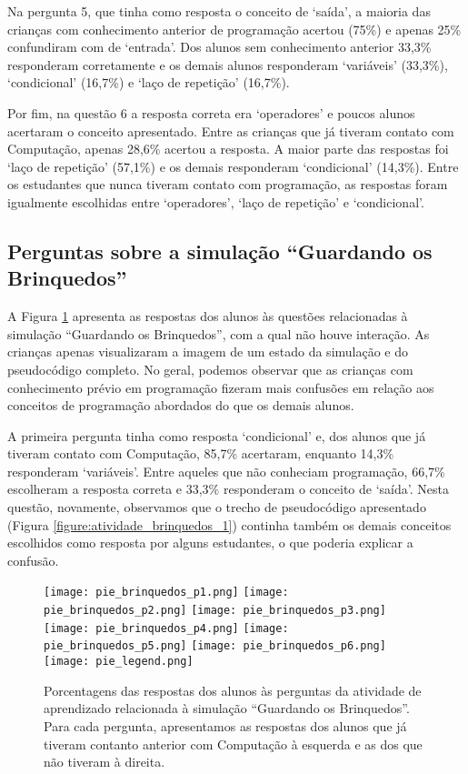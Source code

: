 Na pergunta 5, que tinha como resposta o conceito de \enquote*{saída}, a maioria das crianças com conhecimento anterior de programação acertou (75\%) e apenas 25\% confundiram com de \enquote*{entrada}. Dos alunos sem conhecimento anterior 33,3\% responderam corretamente e os demais alunos responderam \enquote*{variáveis} (33,3\%), \enquote*{condicional} (16,7\%) e \enquote*{laço de repetição} (16,7\%).

Por fim, na questão 6 a resposta correta era \enquote*{operadores} e poucos alunos acertaram o conceito apresentado. Entre as crianças que já tiveram contato com Computação, apenas 28,6\% acertou a resposta. A maior parte das respostas foi \enquote*{laço de repetição} (57,1\%) e os demais responderam \enquote*{condicional} (14,3\%). Entre os estudantes que nunca tiveram contato com programação, as respostas foram igualmente escolhidas entre \enquote*{operadores}, \enquote*{laço de repetição} e \enquote*{condicional}.

\subsection{Perguntas sobre a simulação \enquote{Guardando os Brinquedos}}

A Figura \ref{figure:pies_brinquedos} apresenta as respostas dos alunos às questões relacionadas à simulação \enquote{Guardando os Brinquedos}, com a qual não houve interação. As crianças apenas visualizaram a imagem de um estado da simulação e do pseudocódigo completo. No geral, podemos observar que as crianças com conhecimento prévio em programação fizeram mais confusões em relação aos conceitos de programação abordados do que os demais alunos.

A primeira pergunta tinha como resposta \enquote*{condicional} e, dos alunos que já tiveram contato com Computação, 85,7\% acertaram, enquanto 14,3\% responderam \enquote*{variáveis}. Entre aqueles que não conheciam programação, 66,7\% escolheram a resposta correta e 33,3\% responderam o conceito de \enquote*{saída}. Nesta questão, novamente, observamos que o trecho de pseudocódigo apresentado (Figura \ref{figure:atividade_brinquedos_1}) continha também os demais conceitos escolhidos como resposta por alguns estudantes, o que poderia explicar a confusão.

\begin{figure}[h!]
    \centering
    \texttt{[image: pie\_brinquedos\_p1.png]}
    \texttt{[image: pie\_brinquedos\_p2.png]}
    \texttt{[image: pie\_brinquedos\_p3.png]}
    \texttt{[image: pie\_brinquedos\_p4.png]}
    \texttt{[image: pie\_brinquedos\_p5.png]}
    \texttt{[image: pie\_brinquedos\_p6.png]}
    \texttt{[image: pie\_legend.png]}
    \caption{Porcentagens das respostas dos alunos às perguntas da atividade de aprendizado relacionada à simulação \enquote{Guardando os Brinquedos}. Para cada pergunta, apresentamos as respostas dos alunos que já tiveram contanto anterior com Computação à esquerda e as dos que não tiveram à direita.}
    \label{figure:pies_brinquedos}
\end{figure}

